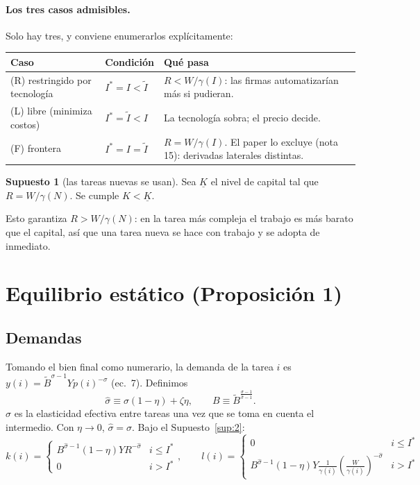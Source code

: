 \documentclass[11pt,a4paper]{article}
\theoremstyle{definition}
\newtheorem{supuesto}{Supuesto}
\theoremstyle{plain}
\theoremstyle{remark}
\numberwithin{equation}{section}
\newcommand{\sh}{\hat\sigma}
\newcommand{\It}{\tilde I}
\newcommand{\Is}{I^{*}}
\newcommand{\Bt}{\tilde B}
\newcommand{\Kl}{\underline K}
\begin{document}
\paragraph{Los tres casos admisibles.} Solo hay tres, y conviene enumerarlos explícitamente:
\begin{center}
\begin{tabular}{@{}p{3.4cm}p{2.6cm}p{8.4cm}@{}}
\toprule
Caso & Condición & Qué pasa \\
\midrule
(R) restringido por tecnología & $\Is=I<\It$ & $R<W/\gamma(I)$: las firmas automatizarían más si pudieran.\\
(L) libre (minimiza costos) & $\Is=\It<I$ & La tecnología sobra; el precio decide.\\
(F) frontera & $\Is=I=\It$ & $R=W/\gamma(I)$. El paper lo excluye (nota 15): derivadas laterales distintas.\\
\bottomrule
\end{tabular}
\end{center}

\begin{supuesto}[las tareas nuevas se usan]\label{sup:3}
Sea $\Kl$ el nivel de capital tal que $R=W/\gamma(N)$. Se cumple $K<\Kl$.
\end{supuesto}
Esto garantiza $R>W/\gamma(N)$: en la tarea más compleja el trabajo es más barato que el capital, así que una
tarea nueva se hace con trabajo y se adopta de inmediato.

\section{Equilibrio estático (Proposición 1)}

\subsection{Demandas}
Tomando el bien final como numerario, la demanda de la tarea $i$ es $y(i)=\Bt^{\sigma-1}Yp(i)^{-\sigma}$ (ec.~7).
Definimos
\[
  \sh\equiv\sigma(1-\eta)+\zeta\eta,\qquad B\equiv\Bt^{\frac{\sigma-1}{\sh-1}}.
\]
$\sh$ es la elasticidad efectiva entre tareas una vez que se toma en cuenta el intermedio. Con $\eta\to0$,
$\sh=\sigma$. Bajo el Supuesto~\ref{sup:2}:
\[
  k(i)=\begin{cases}B^{\sh-1}(1-\eta)YR^{-\sh} & i\le\Is\\ 0 & i>\Is\end{cases},\qquad
  l(i)=\begin{cases}0 & i\le\Is\\ B^{\sh-1}(1-\eta)Y\frac{1}{\gamma(i)}\left(\frac{W}{\gamma(i)}\right)^{-\sh} & i>\Is\end{cases}
\]
\end{document}
